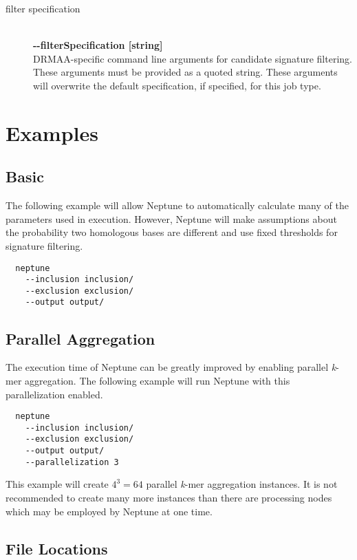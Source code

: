 \documentclass[a4paper,10pt]{article}
\begin{document}
\begin{description}
  \item[filter specification] \hfill \\
  \textbf{-{}-filterSpecification [string]} \hfill \\
  DRMAA-specific command line arguments for candidate signature filtering. These arguments must be provided as a quoted string. These arguments will overwrite the default specification, if specified, for this job type.
  
\end{description}

\newpage
\section{Examples}

\subsection{Basic}

The following example will allow Neptune to automatically calculate many of the parameters used in execution. However, Neptune will make assumptions about the probability two homologous bases are different and use fixed thresholds for signature filtering.

\begin{verbatim}
  neptune
    --inclusion inclusion/
    --exclusion exclusion/
    --output output/ 
\end{verbatim}

\subsection{Parallel Aggregation}

The execution time of Neptune can be greatly improved by enabling parallel \textit{k}-mer aggregation. The following example will run Neptune with this parallelization enabled.

\begin{verbatim}
  neptune
    --inclusion inclusion/
    --exclusion exclusion/
    --output output/
    --parallelization 3
\end{verbatim}

This example will create \(4^3 = 64\) parallel \textit{k}-mer aggregation instances. It is not recommended to create many more instances than there are processing nodes which may be employed by Neptune at one time.

\subsection{File Locations}
\end{document}
